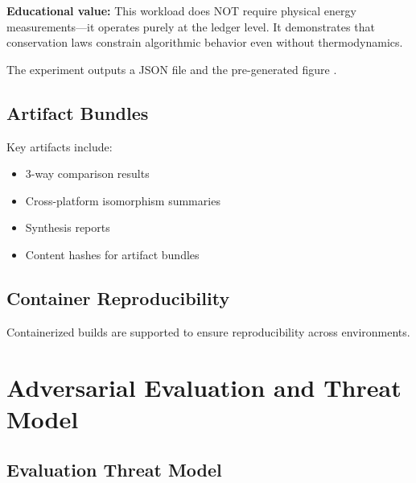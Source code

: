 \textbf{Educational value:} This workload does NOT require physical energy measurements---it operates purely at the ledger level. It demonstrates that conservation laws constrain algorithmic behavior even without thermodynamics.

The experiment outputs a JSON file and the pre-generated figure .

\subsection{Artifact Bundles}

Key artifacts include:
\begin{itemize}
    \item 3-way comparison results
    \item Cross-platform isomorphism summaries
    \item Synthesis reports
    \item Content hashes for artifact bundles
\end{itemize}

\subsection{Container Reproducibility}

Containerized builds are supported to ensure reproducibility across environments.

\section{Adversarial Evaluation and Threat Model}

\subsection{Evaluation Threat Model}


